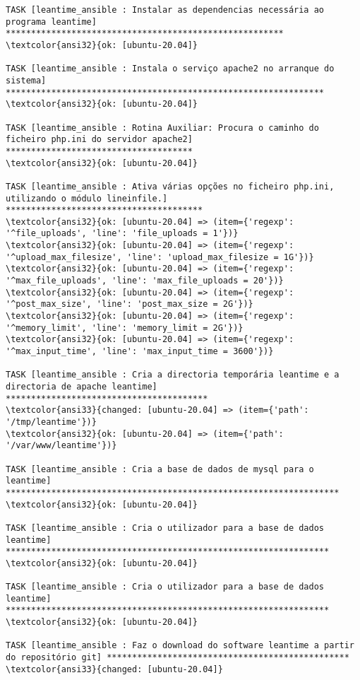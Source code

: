 \documentclass{scrartcl}
\begin{document}
\begin{Verbatim}
TASK [leantime_ansible : Instalar as dependencias necessária ao programa leantime] *******************************************************
\textcolor{ansi32}{ok: [ubuntu-20.04]}

TASK [leantime_ansible : Instala o serviço apache2 no arranque do sistema] ***************************************************************
\textcolor{ansi32}{ok: [ubuntu-20.04]}

TASK [leantime_ansible : Rotina Auxiliar: Procura o caminho do ficheiro php.ini do servidor apache2] *************************************
\textcolor{ansi32}{ok: [ubuntu-20.04]}

TASK [leantime_ansible : Ativa várias opções no ficheiro php.ini, utilizando o módulo lineinfile.] ***************************************
\textcolor{ansi32}{ok: [ubuntu-20.04] => (item={'regexp': '^file_uploads', 'line': 'file_uploads = 1'})}
\textcolor{ansi32}{ok: [ubuntu-20.04] => (item={'regexp': '^upload_max_filesize', 'line': 'upload_max_filesize = 1G'})}
\textcolor{ansi32}{ok: [ubuntu-20.04] => (item={'regexp': '^max_file_uploads', 'line': 'max_file_uploads = 20'})}
\textcolor{ansi32}{ok: [ubuntu-20.04] => (item={'regexp': '^post_max_size', 'line': 'post_max_size = 2G'})}
\textcolor{ansi32}{ok: [ubuntu-20.04] => (item={'regexp': '^memory_limit', 'line': 'memory_limit = 2G'})}
\textcolor{ansi32}{ok: [ubuntu-20.04] => (item={'regexp': '^max_input_time', 'line': 'max_input_time = 3600'})}

TASK [leantime_ansible : Cria a directoria temporária leantime e a directoria de apache leantime] ****************************************
\textcolor{ansi33}{changed: [ubuntu-20.04] => (item={'path': '/tmp/leantime'})}
\textcolor{ansi32}{ok: [ubuntu-20.04] => (item={'path': '/var/www/leantime'})}

TASK [leantime_ansible : Cria a base de dados de mysql para o leantime] ******************************************************************
\textcolor{ansi32}{ok: [ubuntu-20.04]}

TASK [leantime_ansible : Cria o utilizador para a base de dados leantime] ****************************************************************
\textcolor{ansi32}{ok: [ubuntu-20.04]}

TASK [leantime_ansible : Cria o utilizador para a base de dados leantime] ****************************************************************
\textcolor{ansi32}{ok: [ubuntu-20.04]}

TASK [leantime_ansible : Faz o download do software leantime a partir do repositório git] ************************************************
\textcolor{ansi33}{changed: [ubuntu-20.04]}


\end{Verbatim}
\end{document}
